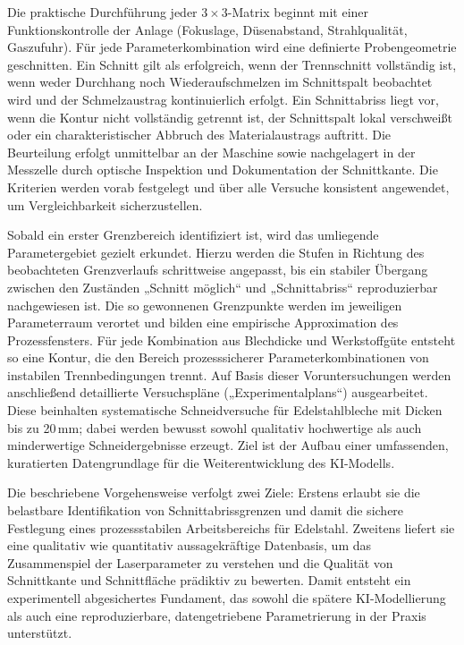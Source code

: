 Die praktische Durchführung jeder $3\times 3$-Matrix beginnt mit einer Funktionskontrolle der Anlage (Fokuslage, Düsenabstand, Strahlqualität, Gaszufuhr). Für jede Parameterkombination wird eine definierte Probengeometrie geschnitten. Ein Schnitt gilt als erfolgreich, wenn der Trennschnitt vollständig ist, wenn weder Durchhang noch Wiederaufschmelzen im Schnittspalt beobachtet wird und der Schmelzaustrag kontinuierlich erfolgt. Ein Schnittabriss liegt vor, wenn die Kontur nicht vollständig getrennt ist, der Schnittspalt lokal verschweißt oder ein charakteristischer Abbruch des Materialaustrags auftritt. Die Beurteilung erfolgt unmittelbar an der Maschine sowie nachgelagert in der Messzelle durch optische Inspektion und Dokumentation der Schnittkante. Die Kriterien werden vorab festgelegt und über alle Versuche konsistent angewendet, um Vergleichbarkeit sicherzustellen.

Sobald ein erster Grenzbereich identifiziert ist, wird das umliegende Parametergebiet gezielt erkundet. Hierzu werden die Stufen in Richtung des beobachteten Grenzverlaufs schrittweise angepasst, bis ein stabiler Übergang zwischen den Zuständen „Schnitt möglich“ und „Schnittabriss“ reproduzierbar nachgewiesen ist. Die so gewonnenen Grenzpunkte werden im jeweiligen Parameterraum verortet und bilden eine empirische Approximation des Prozessfensters. Für jede Kombination aus Blechdicke und Werkstoffgüte entsteht so eine Kontur, die den Bereich prozesssicherer Parameterkombinationen von instabilen Trennbedingungen trennt. Auf Basis dieser Voruntersuchungen werden anschließend detaillierte Versuchspläne („Experimentalplans“) ausgearbeitet. Diese beinhalten systematische Schneidversuche für Edelstahlbleche mit Dicken bis zu 20\,mm; dabei werden bewusst sowohl qualitativ hochwertige als auch minderwertige Schneidergebnisse erzeugt. Ziel ist der Aufbau einer umfassenden, kuratierten Datengrundlage für die Weiterentwicklung des KI-Modells.

Die beschriebene Vorgehensweise verfolgt zwei Ziele: Erstens erlaubt sie die belastbare Identifikation von Schnittabrissgrenzen und damit die sichere Festlegung eines prozessstabilen Arbeitsbereichs für Edelstahl. Zweitens liefert sie eine qualitativ wie quantitativ aussagekräftige Datenbasis, um das Zusammenspiel der Laserparameter zu verstehen und die Qualität von Schnittkante und Schnittfläche prädiktiv zu bewerten. Damit entsteht ein experimentell abgesichertes Fundament, das sowohl die spätere KI-Modellierung als auch eine reproduzierbare, datengetriebene Parametrierung in der Praxis unterstützt.

